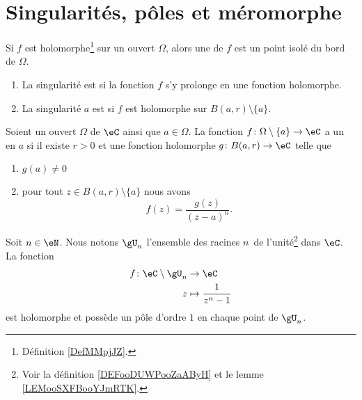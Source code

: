 
\section{Singularités, pôles et méromorphe}

\begin{definition}      \label{DEFooKWDUooVPvtpy}
	Si \( f\) est holomorphe\footnote{Définition \ref{DefMMpjJZ}.} sur un ouvert \( \Omega\), alors une  de \( f\) est un point isolé du bord de \( \Omega\).

	\begin{enumerate}
		\item
		      La singularité est  si la fonction \( f\) s'y prolonge en une fonction holomorphe.
		\item
		      La singularité \( a\) est  si \( f\) est holomorphe sur \( B(a,r)\setminus\{ a \}\).
	\end{enumerate}
\end{definition}


\begin{definition}    \label{DEFooUIJTooUJPiDG}
	Soient un ouvert \( \Omega\) de \( \eC\) ainsi que \( a\in \Omega\). La fonction \( f\colon \Omega\setminus\{ a \}\to \eC\) a un  en \( a\) si il existe \( r>0\) et une fonction holomorphe \( g\colon B(a,r)\to \eC\) telle que
	\begin{enumerate}
		\item
		      \( g(a)\neq 0\)
		\item
		      pour tout \( z\in B(a,r)\setminus\{ a \}\) nous avons
		      \begin{equation}
			      f(z)=\frac{ g(z) }{ (z-a)^n }.
		      \end{equation}
	\end{enumerate}
\end{definition}

\begin{lemma}
	Soit \( n\in \eN\). Nous notons \( \gU_n\) l'ensemble des racines \( n\)\ieme\ de l'unité\footnote{Voir la définition \ref{DEFooDUWPooZaAByH} et le lemme \ref{LEMooSXFBooYJmRTK}.} dans \( \eC\). La fonction
	\begin{equation}
		\begin{aligned}
			f\colon \eC\setminus\gU_n & \to \eC                   \\
			z                         & \mapsto \frac{1}{ z^n-1 }
		\end{aligned}
	\end{equation}
	est holomorphe et possède un pôle d'ordre \( 1\) en chaque point de \( \gU_n\).
\end{lemma}


